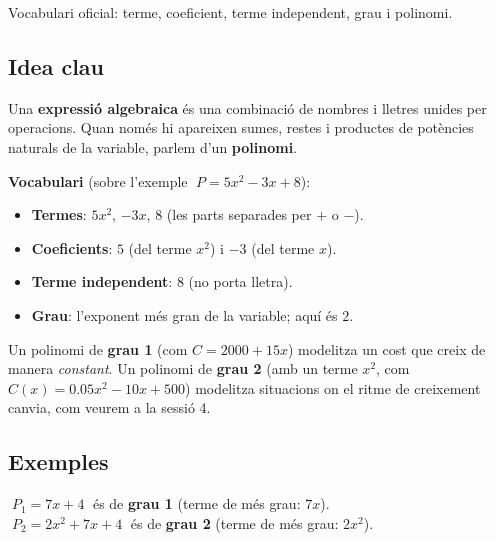 %
{Vocabulari oficial: terme, coeficient, terme independent, grau i polinomi.}

\subsection{Idea clau}

Una \textbf{expressió algebraica} és una combinació de nombres i lletres unides
per operacions. Quan només hi apareixen sumes, restes i productes de potències
naturals de la variable, parlem d'un \textbf{polinomi}.

\begin{idea}
\textbf{Vocabulari} (sobre l'exemple $\;P = 5x^2 - 3x + 8$):
\begin{itemize}[leftmargin=1.4em, itemsep=2pt]
  \item \textbf{Termes}: $5x^2$, \;$-3x$, \;$8$ (les parts separades per $+$ o $-$).
  \item \textbf{Coeficients}: $5$ (del terme $x^2$) i $-3$ (del terme $x$).
  \item \textbf{Terme independent}: $8$ (no porta lletra).
  \item \textbf{Grau}: l'exponent més gran de la variable; aquí és $2$.
\end{itemize}
\end{idea}

Un polinomi de \textbf{grau 1} (com $C=2000+15x$) modelitza un cost que creix de
manera \emph{constant}. Un polinomi de \textbf{grau 2} (amb un terme $x^2$, com
$C(x)=\num{0,05}x^2-10x+500$) modelitza situacions on el ritme de creixement
canvia, com veurem a la sessió 4.

\subsection{Exemples}

\begin{exemple}
$\;P_1 = 7x + 4\;$ és de \textbf{grau 1} (terme de més grau: $7x$). \\[2pt]
$\;P_2 = 2x^2 + 7x + 4\;$ és de \textbf{grau 2} (terme de més grau: $2x^2$).
\end{exemple}

